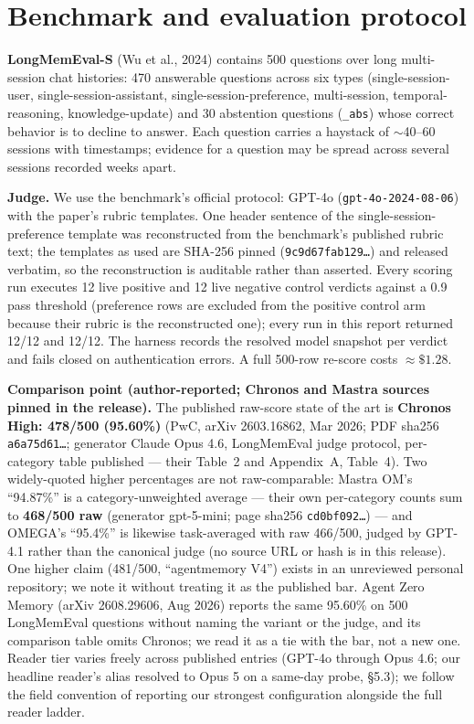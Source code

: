 \documentclass[11pt]{article}
\begin{document}
\section{Benchmark and evaluation protocol}
\textbf{LongMemEval-S} (Wu et al., 2024) contains 500 questions over long
multi-session chat histories: 470 answerable questions across six types
(single-session-user, single-session-assistant, single-session-preference,
multi-session, temporal-reasoning, knowledge-update) and 30 abstention
questions (\texttt{\_abs}) whose correct behavior is to decline to answer.
Each question carries a haystack of $\sim$40--60 sessions with timestamps;
evidence for a question may be spread across several sessions recorded
weeks apart.

\textbf{Judge.} We use the benchmark's official protocol: GPT-4o
(\texttt{gpt-4o-2024-08-06}) with the paper's rubric templates. One header
sentence of the single-session-preference template was reconstructed from the
benchmark's published rubric text; the templates as used are SHA-256 pinned
(\texttt{9c9d67fab129\ldots}) and released verbatim, so the reconstruction is
auditable rather than asserted. Every scoring run executes 12 live positive and
12 live negative control verdicts against a 0.9 pass threshold (preference rows
are excluded from the positive control arm because their rubric is the
reconstructed one); every run in this report returned 12/12 and 12/12. The
harness records the resolved model snapshot per verdict and fails closed on
authentication errors. A full 500-row re-score costs $\approx\$1.28$.

\textbf{Comparison point (author-reported; Chronos and Mastra sources pinned
in the release).} The published
raw-score state of the art is \textbf{Chronos High: 478/500 (95.60\%)} (PwC,
arXiv 2603.16862, Mar 2026; PDF sha256 \texttt{a6a75d61\ldots}; generator Claude Opus 4.6, LongMemEval judge
protocol, per-category table published --- their Table~2 and Appendix~A,
Table~4). Two widely-quoted higher percentages
are not raw-comparable: Mastra OM's ``94.87\%'' is a category-unweighted
average --- their own per-category counts sum to \textbf{468/500 raw}
(generator gpt-5-mini; page sha256 \texttt{cd0bf092\ldots}) --- and OMEGA's ``95.4\%'' is likewise task-averaged
with raw 466/500, judged by GPT-4.1 rather than the canonical judge (no source URL or hash is in this release). One higher
claim (481/500, ``agentmemory V4'') exists in an unreviewed personal
repository; we note it without treating it as the published bar. Agent Zero
Memory (arXiv 2608.29606, Aug 2026) reports the same 95.60\% on 500
LongMemEval questions without naming the variant or the judge, and its
comparison table omits Chronos; we read it as a tie with the bar, not a new
one. Reader tier
varies freely across published entries (GPT-4o through Opus 4.6; our headline
reader's alias resolved to Opus 5 on a same-day probe, \S5.3); we follow the
field convention of reporting our strongest configuration alongside the full
reader ladder.
\end{document}
